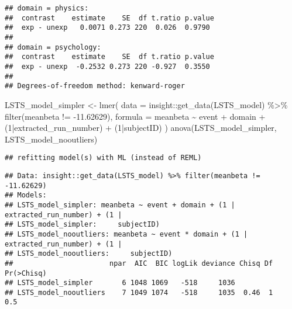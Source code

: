 \documentclass[
]{article}
\newenvironment{Shaded}{\begin{snugshade}}{\end{snugshade}}
\newcommand{\AttributeTok}[1]{\textcolor[rgb]{0.77,0.63,0.00}{#1}}
\newcommand{\DecValTok}[1]{\textcolor[rgb]{0.00,0.00,0.81}{#1}}
\newcommand{\FloatTok}[1]{\textcolor[rgb]{0.00,0.00,0.81}{#1}}
\newcommand{\FunctionTok}[1]{\textcolor[rgb]{0.00,0.00,0.00}{#1}}
\newcommand{\NormalTok}[1]{#1}
\newcommand{\OtherTok}[1]{\textcolor[rgb]{0.56,0.35,0.01}{#1}}
\newcommand{\SpecialCharTok}[1]{\textcolor[rgb]{0.00,0.00,0.00}{#1}}
\begin{document}
\begin{Shaded}
\end{Shaded}

\begin{verbatim}
## domain = physics:
##  contrast    estimate    SE  df t.ratio p.value
##  exp - unexp   0.0071 0.273 220  0.026  0.9790 
## 
## domain = psychology:
##  contrast    estimate    SE  df t.ratio p.value
##  exp - unexp  -0.2532 0.273 220 -0.927  0.3550 
## 
## Degrees-of-freedom method: kenward-roger
\end{verbatim}

\begin{Shaded}
\begin{Highlighting}[]
\NormalTok{LSTS\_model\_simpler }\OtherTok{\textless{}{-}} \FunctionTok{lmer}\NormalTok{(}
      \AttributeTok{data =}\NormalTok{ insight}\SpecialCharTok{::}\FunctionTok{get\_data}\NormalTok{(LSTS\_model) }\SpecialCharTok{\%\textgreater{}\%}
        \FunctionTok{filter}\NormalTok{(meanbeta }\SpecialCharTok{!=} \SpecialCharTok{{-}}\FloatTok{11.62629}\NormalTok{),}
      \AttributeTok{formula =}\NormalTok{ meanbeta }\SpecialCharTok{\textasciitilde{}}\NormalTok{ event }\SpecialCharTok{+}\NormalTok{ domain }\SpecialCharTok{+}\NormalTok{ (}\DecValTok{1}\SpecialCharTok{|}\NormalTok{extracted\_run\_number) }\SpecialCharTok{+}\NormalTok{ (}\DecValTok{1}\SpecialCharTok{|}\NormalTok{subjectID)}
\NormalTok{    )}
\FunctionTok{anova}\NormalTok{(LSTS\_model\_simpler, LSTS\_model\_nooutliers)}
\end{Highlighting}
\end{Shaded}

\begin{verbatim}
## refitting model(s) with ML (instead of REML)
\end{verbatim}

\begin{verbatim}
## Data: insight::get_data(LSTS_model) %>% filter(meanbeta != -11.62629)
## Models:
## LSTS_model_simpler: meanbeta ~ event + domain + (1 | extracted_run_number) + (1 | 
## LSTS_model_simpler:     subjectID)
## LSTS_model_nooutliers: meanbeta ~ event * domain + (1 | extracted_run_number) + (1 | 
## LSTS_model_nooutliers:     subjectID)
##                       npar  AIC  BIC logLik deviance Chisq Df Pr(>Chisq)
## LSTS_model_simpler       6 1048 1069   -518     1036                    
## LSTS_model_nooutliers    7 1049 1074   -518     1035  0.46  1        0.5
\end{verbatim}
\end{document}
